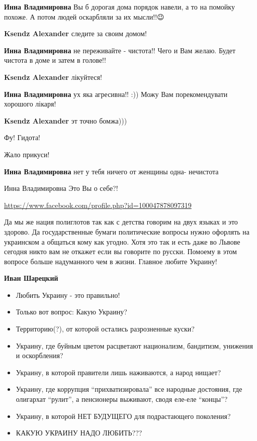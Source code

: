 \begin{itemize}
\begin{itemize}
\textbf{Инна Владимировна} Вы б дорогая дома порядок навели, а то на помойку похоже. А потом людей оскарбляли за их мысли!!😉

\textbf{Ksendz Alexander} следите за своим домом!

\textbf{Инна Владимировна} не переживайте - чистота!! Чего и Вам желаю. Будет чистота в доме и затем в голове!!

\textbf{Ksendz Alexander} лікуйтеся!

\textbf{Инна Владимировна} ух яка агресивна!! :)) Можу Вам порекомендувати хорошого лікаря!

\textbf{Ksendz Alexander} эт точно бомжа)))

Фу! Гидота!

Жало прикуси!

\textbf{Инна Владимировна} нет у тебя ничего от женщины одна- нечистота

Инна Владимировна Это Вы о себе?!
\end{itemize}

\url{https://www.facebook.com/profile.php?id=100047878097319}

Да мы же нация полиглотов так как с детства говорим на двух языках и это
здорово. Да государственные бумаги политические вопросы нужно офорлять на
украинском а общаться кому как угодно. Хотя это так и есть даже во Львове
сегодня никто вам не откажет если вы говорите по русски. Помоему в этом вопросе
больше надуманного чем в жизни. Главное любите Украину!

\begin{itemize}

\textbf{Иван Шарецкий}

\begin{itemize}
  \item Любить Украину - это правильно!
  \item Только вот вопрос: Какую Украину?
  \item Территорию(?), от которой остались разрозненные куски?
  \item Украину, где буйным цветом расцветают национализм, бандитизм, унижения и оскорбления?
  \item Украину, в которой правители лишь наживаются, а народ нищает?
	\item Украину, где коррупция \enquote{прихватизировала} все народные достояния, где
	олигархат \enquote{рулит}, а пенсионеры выживают, сводя еле-еле \enquote{концы}?
  \item Украину, в которой НЕТ БУДУЩЕГО для подрастающего поколения?
  \item КАКУЮ УКРАИНУ НАДО ЛЮБИТЬ???
\end{itemize}


\end{itemize}
\end{itemize}
